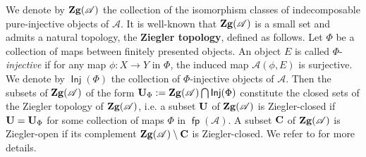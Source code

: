 \documentclass[oneside, a4paper,reqno]{amsart}
\numberwithin{equation}{section}
\theoremstyle{definition}
\begin{document}
We denote by ${\bf Zg}({\mathscr A})$ the collection of the isomorphism
classes of indecomposable pure-injective objects of ${\mathscr A}$. It is
well-known that ${\bf Zg}({\mathscr A})$ is a small set and admits a natural
topology, the {\bf Ziegler topology}, defined as follows. Let $\Phi$
be a collection of maps between finitely presented objects. An
object $E$ is called $\Phi$-{\em injective} if for any map $\phi
\colon X{\longrightarrow} Y$ in $\Phi$, the induced map ${\mathscr A}(\phi,E)$ is
surjective. We denote by $\operatorname*{\mathsf{Inj}}(\Phi)$ the collection of
$\Phi$-injective objects of ${\mathscr A}$. Then the subsets of ${\bf Zg}({\mathscr A})$
of the form ${\bf U}_{\Phi} := {\bf Zg}({\mathscr A}) \bigcap \operatorname*{\mathsf{Inj}}(\Phi)$
constitute the closed sets of the Ziegler topology of ${\bf
Zg}({\mathscr A})$, i.e. a subset ${\bf U}$ of ${\bf Zg}({\mathscr A})$ is
Ziegler-closed if ${\bf U} = {\bf U}_{\Phi}$ for some collection of
maps $\Phi$ in $\operatorname*{\mathsf{fp}}({\mathscr A})$. A subset ${\bf C}$ of ${\bf Zg}({\mathscr A})$ is
Ziegler-open if its complement ${\bf Zg}({\mathscr A})\setminus {\bf C}$ is
Ziegler-closed. We refer to \cite{Krause:memoirs} for more details.
\end{document}
